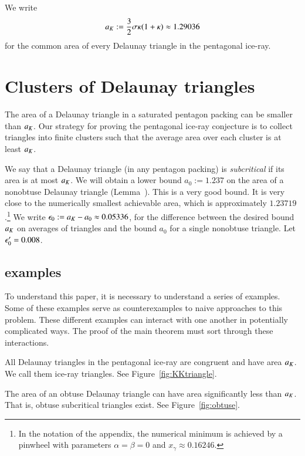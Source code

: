 We write 
\[
a_K := \frac{3}{2}{ \sigma \kappa(1+\kappa)} \approx 1.29036
\] %
for the common area of every Delaunay triangle in the 
pentagonal ice-ray.

\section{Clusters of Delaunay triangles}

The area of a Delaunay triangle in a saturated pentagon packing can be
smaller than $a_K$.  Our strategy for proving the pentagonal ice-ray conjecture
is to collect triangles into finite clusters such that the average
area over each cluster is at least $a_K$.  

We say that a Delaunay triangle (in any pentagon packing) is {\it
  subcritical} if its area is at most $a_K$.  We will obtain a lower
bound $a_0 := 1.237$ on the area of a nonobtuse Delaunay triangle
(Lemma~).  This is a very good bound.  It is very close
to the numerically smallest achievable area, which is approximately
$1.23719$.\footnote{In the notation of the appendix, the numerical 
minimum is achieved by a pinwheel with parameters $\alpha=\beta=0$
and $x_\gamma\approx 0.16246$.}  
We write $\epsilon_0 := a_K - a_0 \approx 0.05336$, for the
difference between the desired bound $a_K$ on averages of triangles
and the bound $a_0$ for a single nonobtuse triangle.
Let $\epsilon_0' = 0.008$.  

\subsection{examples}

To understand this paper, it is necessary to understand a series of examples.
Some of these examples serve as counterexamples to naive approaches to this problem.
These different examples can interact with one another in potentially complicated ways.  The proof
of the main theorem must sort through these interactions.

\begin{example} All Delaunay triangles in the pentagonal ice-ray are congruent and have
area $a_K$.
We call them ice-ray triangles. See Figure~\ref{fig:KKtriangle}.
\end{example}


\begin{example}  The area of an obtuse Delaunay triangle can have area
significantly less than $a_K$.  That is, obtuse subcritical triangles exist.
See Figure~\ref{fig:obtuse}.
\end{example}


